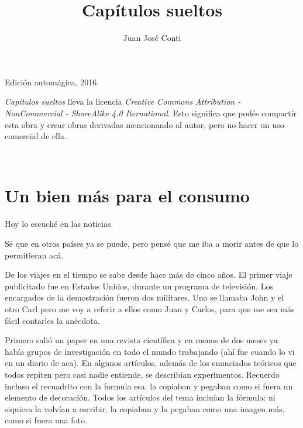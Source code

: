 \documentclass[12pt,twoside,openright]{book}
\title{Capítulos sueltos}
\author{Juan José Conti}
\date{}
\begin{document}

\pagestyle{plain}


%
%

\maketitle

\cleardoublepage

\thispagestyle{empty}
\noindent
Edición automágica, 2016.\\

\vspace{0.5cm}

\noindent
\emph{Capítulos sueltos} lleva la licencia
\emph{Creative Commons Attribution - NonCommercial - ShareAlike 4.0 Iternational}.
Esto significa que podés compartir esta obra y crear obras derivadas
mencionando al autor, pero no ha\-cer un uso comercial de ella.

\vfill

\noindent
\\

\cleardoublepage


\renewcommand*\contentsname{Índice}

\tableofcontents


\cleardoublepage




\chapter*{Un bien más para el consumo} 


Hoy lo escuché en las noticias.

Sé que en otros países ya se puede, pero pensé que me iba a morir antes de que lo permitieran acá.

De los viajes en el tiempo se sabe desde hace más de cinco años. El primer viaje publicitado fue en Estados Unidos, durante un programa de televisión. Los encargados de la demostración fueron dos militares. Uno se llamaba John y el otro Carl pero me voy a referir a ellos como Juan y Carlos, para que me sea más fácil contarles la anécdota.

Primero salió un paper en una revista científica y en menos de dos meses ya había grupos de investigación en todo el mundo trabajando (ahí fue cuando lo vi en un diario de aca). En algunos artículos, además de los enunciados teóricos que todos repiten pero casi nadie entiende, se describían experimentos. Recuerdo incluso el recuadrito con la formula esa: la copiaban y pegaban como si fuera un elemento de decoración. Todos los artículos del tema incluían la fórmula: ni siquiera la volvían a escribir, la copiaban y la pegaban como una imagen más, como si fuera una foto.
\end{document}
